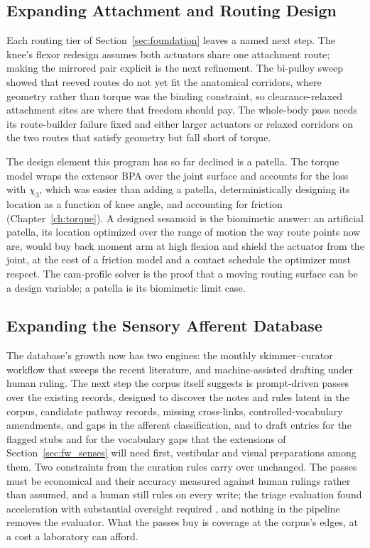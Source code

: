 \subsection{Expanding Attachment and Routing Design}\label{sec:fw_routing}

Each routing tier of Section~\ref{sec:foundation} leaves a named next step. The knee's flexor redesign assumes both actuators share one attachment route; making the mirrored pair explicit is the next refinement. The bi-pulley sweep showed that reeved routes do not yet fit the anatomical corridors, where geometry rather than torque was the binding constraint, so clearance-relaxed attachment sites are where that freedom should pay. The whole-body pass needs its route-builder failure fixed and either larger actuators or relaxed corridors on the two routes that satisfy geometry but fall short of torque.

The design element this program has so far declined is a patella. The torque model wraps the extensor BPA over the joint surface and accounts for the loss with $\chi_{3}$, which was easier than adding a patella, deterministically designing its location as a function of knee angle, and accounting for friction (Chapter~\ref{ch:torque}). A designed sesamoid is the biomimetic answer: an artificial patella, its location optimized over the range of motion the way route points now are, would buy back moment arm at high flexion and shield the actuator from the joint, at the cost of a friction model and a contact schedule the optimizer must respect. The cam-profile solver is the proof that a moving routing surface can be a design variable; a patella is its biomimetic limit case.

\subsection{Expanding the Sensory Afferent Database}\label{sec:fw_database}

The database's growth now has two engines: the monthly skimmer--curator workflow that sweeps the recent literature, and machine-assisted drafting under human ruling. The next step the corpus itself suggests is prompt-driven passes over the existing records, designed to discover the notes and rules latent in the corpus, candidate pathway records, missing cross-links, controlled-vocabulary amendments, and gaps in the afferent classification, and to draft entries for the flagged stubs and for the vocabulary gaps that the extensions of Section~\ref{sec:fw_senses} will need first, vestibular and visual preparations among them. Two constraints from the curation rules carry over unchanged. The passes must be economical and their accuracy measured against human rulings rather than assumed, and a human still rules on every write; the triage evaluation found acceleration with substantial oversight required \citep{bolen_using_2024}, and nothing in the pipeline removes the evaluator. What the passes buy is coverage at the corpus's edges, at a cost a laboratory can afford.

